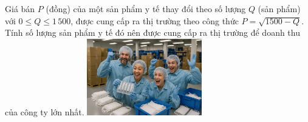  \begin{ex}%
\immini
{
    Giá bán $P$ (đồng) của một sản phẩm y tế thay đổi theo số lượng $ Q$ (sản phẩm) với $ 0\le Q\le 1\,500$, được cung cấp ra thị trường theo công thức $ P=\sqrt{1500-Q}$. Tính số lượng sản phẩm y tế đó nên được cung cấp ra thị trường để doanh thu của công ty lớn nhất.
}
{
    \includegraphics[width=5cm]{img/HXN-11-18}
}
\end{ex}
